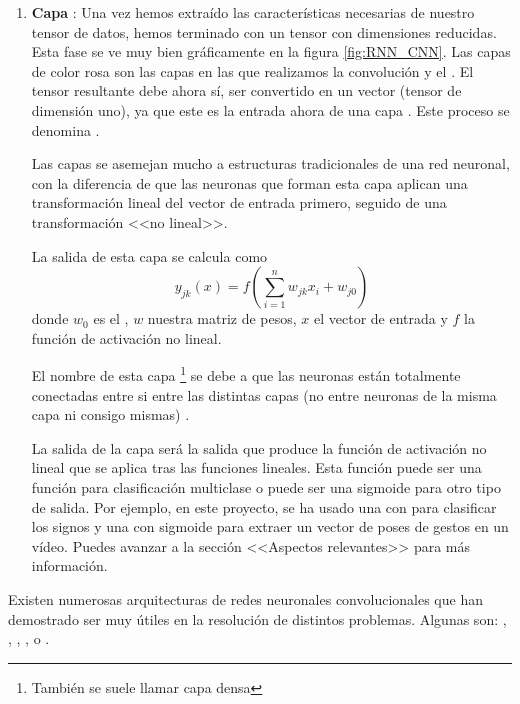 \begin{itemize}
\begin{enumerate}
          \item \textbf{Capa }: Una vez hemos extraído las características necesarias de nuestro tensor de datos, hemos terminado con un tensor con dimensiones reducidas. Esta fase se ve muy bien gráficamente en la figura \ref{fig:RNN_CNN}. Las capas de color rosa son las capas en las que realizamos la convolución y el . El tensor resultante debe ahora sí, ser convertido en un vector (tensor de dimensión uno), ya que este es la entrada ahora de una capa . Este proceso se denomina .

                Las capas  se asemejan mucho a estructuras tradicionales de una red neuronal, con la diferencia de que las neuronas que forman esta capa aplican una transformación lineal del vector de entrada primero, seguido de una transformación <<no lineal>>.

                La salida de esta capa se calcula como \[
                  y_{j k}(x)=f\left(\sum_{i=1}^{n} w_{j k} x_{i}+w_{j 0}\right)
                \] donde $w_0$ es el , $w$ nuestra matriz de pesos, $x$ el vector de entrada y $f$ la función de activación no lineal.

                El nombre de esta capa \footnote{También se suele llamar capa densa} se debe a que las neuronas están totalmente conectadas entre si entre las distintas capas (no entre neuronas de la misma capa ni consigo mismas) .

                La salida de la capa  será la salida que produce la función de activación no lineal que se aplica tras las funciones lineales. Esta función puede ser una función  para clasificación multiclase o puede ser una sigmoide para otro tipo de salida. Por ejemplo, en este proyecto, se ha usado una  con  para clasificar los signos y una  con sigmoide para extraer un vector de poses de gestos en un vídeo. Puedes avanzar a la sección <<Aspectos relevantes>> para más información.
        \end{enumerate}

        Existen numerosas arquitecturas de redes neuronales convolucionales que han demostrado ser muy útiles en la resolución de distintos problemas. Algunas son:  , ,  ,  ,   o  .
\end{itemize}

